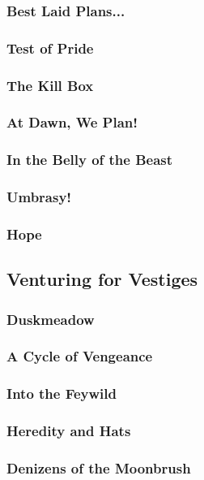         \subsubsection{Best Laid Plans...}
        \subsubsection{Test of Pride}
        \subsubsection{The Kill Box}
        \subsubsection{At Dawn, We Plan!}
        \subsubsection{In the Belly of the Beast}
        \subsubsection{Umbrasy!}
        \subsubsection{Hope}
        
    \newpage
    \subsection{Venturing for Vestiges} \vspace*{\fill}
    \newpage
        \subsubsection{Duskmeadow}
        \subsubsection{A Cycle of Vengeance}
        \subsubsection{Into the Feywild}
        \subsubsection{Heredity and Hats}
        \subsubsection{Denizens of the Moonbrush}
